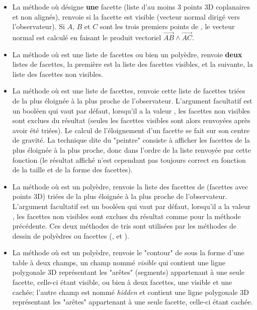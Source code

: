 \begin{itemize}
    \item La méthode  où  désigne \textbf{une} facette (liste d'au moins 3 points 3D coplanaires et non alignés), renvoie \true si la facette  est visible (vecteur normal dirigé vers l'observateur). Si $A$, $B$ et $C$ sont les trois premiers points de , le vecteur normal est calculé en faisant le produit vectoriel $\vec{AB}\wedge\vec{AC}$.
    
    \item La méthode  où  est une liste de facettes ou bien un polyèdre, renvoie \textbf{deux} listes de facettes, la première est la liste des facettes visibles, et la suivante, la liste des facettes non visibles.
    
    \item La méthode  où  est une liste de facettes, renvoie cette liste de facettes triées de la plus éloignée à la plus proche de l'observateur. L'argument facultatif  est un booléen qui vaut \false par défaut, lorsqu'il a la valeur \true, les facettes non visibles sont exclues du résultat (seules les facettes visibles sont alors renvoyées après avoir été triées). Le calcul de l'éloignement d'un facette se fait sur son centre de gravité. La technique dite du "peintre" consiste à afficher les facettes de la plus éloignée à la plus proche, donc dans l'ordre de la liste renvoyée par cette fonction (le résultat affiché n'est cependant pas toujours correct en fonction de la taille et de la forme des facettes).
    
    \item La méthode  où  est un polyèdre, renvoie la liste des facettes de  (facettes avec points 3D) triées de la plus éloignée à la plus proche de l'observateur. L'argument facultatif  est un booléen qui vaut \false par défaut, lorsqu'il a la valeur \true, les facettes non visibles sont exclues du résultat comme pour la méthode précédente. Ces deux méthodes de tris sont utilisées par les méthodes de dessin de polyèdres ou facettes (,  et ).
    
    \item La méthode  où  est un polyèdre, renvoie le "contour" de  sous la forme d'une table à deux champs, un champ nommé \emph{visible} qui contient une ligne polygonale 3D représentant les "arêtes" (segments) appartenant à une seule facette, celle-ci étant visible, ou bien à deux facettes, une visible et une cachée; l'autre champ est nommé \emph{hidden} et contient une ligne polygonale 3D représentant les "arêtes" appartenant à une seule facette, celle-ci étant cachée.
    

\end{itemize}

